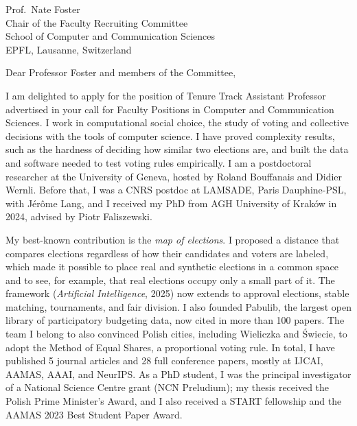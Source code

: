 \documentclass[11pt,a4paper]{article}
\begin{document}
\docheader{}

Prof.\ Nate Foster\\
Chair of the Faculty Recruiting Committee\\
School of Computer and Communication Sciences\\
EPFL, Lausanne, Switzerland

Dear Professor Foster and members of the Committee,

I am delighted to apply for the position of Tenure Track Assistant Professor
advertised in your call for Faculty Positions in Computer and Communication
Sciences. I work in computational social choice, the study of voting and collective
decisions with the tools of computer science. I have proved complexity results, such as the hardness of deciding how
similar two elections are, and built the data and software needed to test
voting rules empirically. I am a postdoctoral researcher at the University of Geneva, hosted by Roland
Bouffanais and Didier Wernli. Before that, I was a CNRS postdoc at LAMSADE,
Paris Dauphine-PSL, with Jérôme Lang, and I received my PhD from AGH University of Kraków in 2024, advised by Piotr
Faliszewski.

My best-known contribution is the \emph{map of elections}. I proposed a
distance that compares elections regardless of how their candidates and voters
are labeled, which made it possible to place real and synthetic elections in a
common space and to see, for example, that real elections occupy only a small
part of it. The framework (\emph{Artificial Intelligence}, 2025) now extends to
approval elections, stable matching, tournaments, and fair division.
I also founded Pabulib, the largest
open library of participatory budgeting data, now cited in more than 100 papers. The team I belong to also convinced Polish
cities, including Wieliczka
and \'Swiecie, to adopt the Method of Equal Shares, a proportional voting rule.
In total, I have published 5 journal articles and 28 full conference papers,
mostly at IJCAI, AAMAS, AAAI, and NeurIPS. As a PhD student, I was the
principal investigator of a National Science Centre grant (NCN Preludium); my
thesis received the Polish Prime Minister's Award, and I also received a
START fellowship and the AAMAS 2023 Best Student Paper Award.
\end{document}
